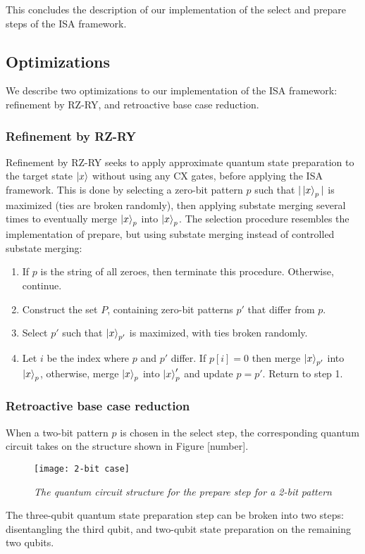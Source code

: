 \documentclass{article}
\begin{document}
This concludes the description of our implementation of the select and prepare
steps of the ISA framework.

\subsection{Optimizations}
We describe two optimizations to our implementation of the ISA framework:
refinement by RZ-RY, and retroactive base case reduction.
\subsubsection{Refinement by RZ-RY}
Refinement by RZ-RY seeks to apply approximate quantum state preparation to the
target state $\mathinner{|{x}\rangle}$ without using any CX gates, before applying the ISA
framework. This is done by selecting a zero-bit pattern $p$ such that 
$|\mathinner{|{x}\rangle}_p|$ is maximized (ties are broken randomly), then applying substate
merging several times to eventually merge $\mathinner{|{x}\rangle}_p$ into $\mathinner{|{x}\rangle}_p$. The
selection procedure resembles the implementation of prepare, but using substate
merging instead of controlled substate merging:
\begin{enumerate}
\item If $p$ is the string of all zeroes, then terminate this procedure.
Otherwise, continue.
\item Construct the set $P$, containing zero-bit patterns $p'$ that differ from 
$p$.
\item Select $p'$ such that $\mathinner{|{x}\rangle}_{p'}$ is maximized, with ties broken
randomly.
\item Let $i$ be the index where $p$ and $p'$ differ. If $p[i] = 0$ then merge
$\mathinner{|{x}\rangle}_{p'}$ into $\mathinner{|{x}\rangle}_p$, otherwise, merge $\mathinner{|{x}\rangle}_p$ into $\mathinner{|{x}\rangle}_p'$
and update $p = p'$. Return to step 1.
\end{enumerate}
\subsubsection{Retroactive base case reduction}
When a two-bit pattern $p$ is chosen in the select step, the corresponding
quantum circuit takes on the structure shown in Figure [number].

\begin{figure}[H]
\centering
\texttt{[image: 2-bit case]}
\caption{\textit{The quantum circuit structure for the prepare step for a 2-bit
pattern}}
\end{figure}

The three-qubit quantum state preparation step can be broken into two steps:
disentangling the third qubit, and two-qubit state preparation on the remaining
two qubits.
\end{document}
